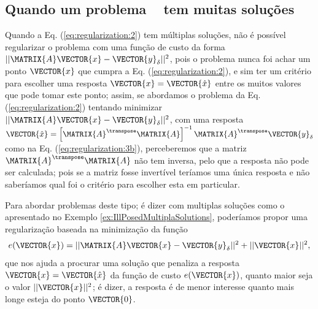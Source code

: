 \subsection{Quando um problema \illposed~ tem muitas soluções}
Quando a Eq. (\ref{eq:regularization:2}) tem múltiplas soluções, 
não é possível regularizar o problema com uma função de custo da forma 
$||\MATRIX{A}\VECTOR{x}-\VECTOR{y}_{\delta}||^2$,
pois o problema nunca foi achar um ponto $\VECTOR{x}$ que cumpra a Eq. (\ref{eq:regularization:2}), 
e sim ter um critério para escolher uma resposta $\VECTOR{x}=\VECTOR{\hat{x}}$ entre os muitos valores que pode tomar este ponto;
assim, se abordamos o problema da Eq. (\ref{eq:regularization:2}) tentando minimizar $||\MATRIX{A}\VECTOR{x}-\VECTOR{y}_{\delta}||^2$,
com uma resposta $\VECTOR{\hat{x}} = \left[ \MATRIX{A}^{\transpose} \MATRIX{A} \right]^{-1}\MATRIX{A}^{\transpose}\VECTOR{y}_{\delta}$
como na Eq. (\ref{eq:regularization:3b}),
perceberemos que a matriz $\MATRIX{A}^{\transpose}\MATRIX{A}$ não tem inversa,
pelo que a resposta não pode ser calculada;
pois se a matriz fosse invertível teríamos uma única resposta e não saberíamos
qual foi o critério para escolher esta em particular.

Para abordar problemas deste tipo; é dizer com multiplas soluções
como o apresentado no Exemplo \ref{ex:IllPosedMultiplaSolutions}, 
poderíamos propor uma regularização baseada na minimização
da função 
\begin{equation}\label{eq:regularization:4}
e(\VECTOR{x})=||\MATRIX{A}\VECTOR{x}-\VECTOR{y}_{\delta}||^2+||\VECTOR{x}||^2,
\end{equation}
que nos ajuda a procurar uma solução que penaliza a resposta $\VECTOR{x}=\VECTOR{\hat{x}}$ da função de custo $e(\VECTOR{x})$, 
quanto maior seja o valor $||\VECTOR{x}||^2$;
é dizer, a resposta é de menor interesse quanto mais longe esteja do ponto $\VECTOR{0}$.


